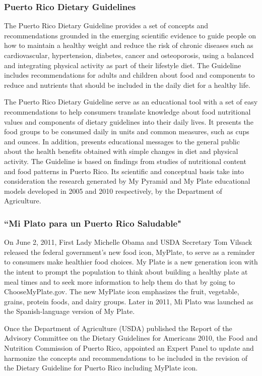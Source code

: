 \documentclass[12pt,letterpaper]{report}
\begin{document}
\subsubsection{Puerto Rico Dietary Guidelines}

The Puerto Rico Dietary Guideline provides a set of concepts and recommendations grounded in the emerging scientific evidence to guide people on how to maintain a healthy weight and reduce the risk of chronic diseases such as cardiovascular, hypertension, diabetes, cancer and osteoporosis, using a balanced and integrating physical activity as part of their lifestyle diet. The Guideline includes recommendations for adults and children about food and components to reduce and nutrients that should be included in the daily diet for a healthy life.

The Puerto Rico Dietary Guideline serve as an educational tool with a set of easy recommendations to help consumers translate knowledge about food nutritional values and components of dietary guidelines into their daily lives. It presents the food groups to be consumed daily in units and common measures, such as cups and ounces. In addition, presents educational messages to the general public about the health benefits obtained with simple changes in diet and physical activity.  The Guideline is based on findings from studies of nutritional content and food patterns in Puerto Rico. Its scientific and conceptual basis take into consideration the research generated by My Pyramid and My Plate educational models developed in 2005 and 2010 respectively, by the Department of Agriculture. \cite{GuiaAlimentariaPR}

\subsubsection{``Mi Plato para un Puerto Rico Saludable"}

On June 2, 2011, First Lady Michelle Obama and USDA Secretary Tom Vilsack released the federal government’s new food icon, MyPlate, to serve as a reminder to consumers make healthier food choices. My Plate is a new generation icon with the intent to prompt the population to think about building a healthy plate at meal times and to seek more information to help them do that by going to ChooseMyPlate.gov. The new MyPlate icon emphasizes the fruit, vegetable, grains, protein foods, and dairy groups. Later in 2011, Mi Plato was launched as the Spanish-language version of My Plate.

Once the Department of Agriculture (USDA) published the Report of the Advisory Committee on the Dietary Guidelines for Americans 2010, the Food and Nutrition Commission of Puerto Rico, appointed an Expert Panel to update and harmonize the concepts and recommendations to be included in the revision of the Dietary Guideline for Puerto Rico including MyPlate icon.
\end{document}
